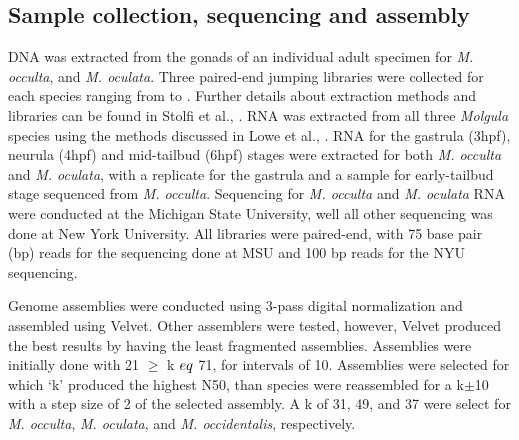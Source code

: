 \subsection{Sample collection, sequencing and assembly}
DNA was extracted from the gonads of an individual adult specimen for %
\textit{M. occulta}, and \textit{M. oculata}. Three paired-end jumping libraries were collected for each species ranging from  to . Further details about extraction methods and libraries can be found in Stolfi et al., \cite{stolfi_divergent_2014}. RNA was extracted from all three \textit{Molgula} species using the methods discussed in Lowe et al., \cite{}. RNA for the gastrula (3hpf), neurula (4hpf) and mid-tailbud (6hpf) stages were extracted for both \textit{M. occulta} and \textit{M. oculata}, with a replicate for the gastrula and a sample for early-tailbud stage sequenced from \textit{M. occulta}. %
Sequencing for \textit{M. occulta} and \textit{M. oculata} RNA were conducted at the Michigan State University, well all other sequencing was done at New York University. All libraries were paired-end, with 75 base pair (bp) reads for the sequencing done at MSU and 100 bp reads for the NYU sequencing. 

Genome assemblies were conducted using 3-pass digital normalization \cite{brown_reference-free_2012} and assembled using Velvet\cite{zerbino_velvet:_2008}. Other assemblers were tested, however, Velvet produced the best results by having the least fragmented assemblies. Assemblies were initially done with 21 $\geq$ k $\/eq$ 71, for intervals of 10. Assemblies were selected for which `k' produced the highest N50, than species were reassembled for a k$\pm$10 with a step size of 2 of the selected assembly. A k of 31, 49, and 37 were select for \textit{M. occulta}, \textit{M. oculata}, and \textit{M. occidentalis}, respectively. 

